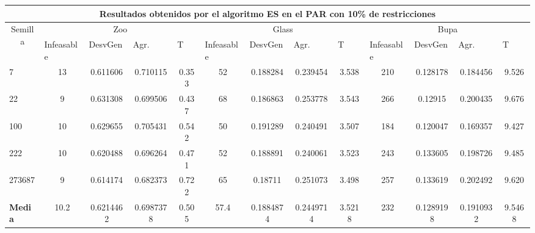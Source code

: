 \begin{table}[H]
	\tiny

	\begin{adjustwidth}{-1cm}{-1cm}%
	
	\begin{tabular}{|l|c|c|c|c|c|c|c|c|c|c|c|c|}
	\hline
	\multicolumn{13}{|c|}{\textbf{Resultados obtenidos por el algoritmo ES en el PAR con 10\% de restricciones}}                                                                                                                                                                                                                                                                                                                                            \\ \hline
	\multicolumn{1}{|c|}{\multirow{2}{*}{Semilla}} & \multicolumn{4}{c|}{Zoo}                                                                                          & \multicolumn{4}{c|}{Glass}                                                                                         & \multicolumn{4}{c|}{Bupa}                                                                                          \\ \cline{2-13} 
	\multicolumn{1}{|c|}{}                                  & \multicolumn{1}{l|}{Infeasable} & \multicolumn{1}{l|}{DesvGen} & \multicolumn{1}{l|}{Agr.} & \multicolumn{1}{l|}{T} & \multicolumn{1}{l|}{Infeasable} & \multicolumn{1}{l|}{DesvGen} & \multicolumn{1}{l|}{Agr.} & \multicolumn{1}{l|}{T} & \multicolumn{1}{l|}{Infeasable} & \multicolumn{1}{l|}{DesvGen} & \multicolumn{1}{l|}{Agr.} & \multicolumn{1}{l|}{T} \\ \hline
	7   	& 13 & 0.611606 & 0.710115 & 0.353 & 			52 & 0.188284 & 0.239454 & 3.538 &			 	210 & 0.128178 & 0.184456 & 9.526 		\\ \hline
	22 		& 9 & 0.631308 & 0.699506 & 0.437 &			68 & 0.186863 & 0.253778 & 3.543 &		 		266 & 0.12915 & 0.200435 & 9.676		\\ \hline
	100 	& 10 & 0.629655 & 0.705431 & 0.542 &			50 & 0.191289 & 0.240491 & 3.507 &			184 & 0.120047 & 0.169357 & 9.427		\\ \hline
	222 	& 10 & 0.620488 & 0.696264 & 0.471 &			52 & 0.188891 & 0.240061 & 3.523 &			243 & 0.133605 & 0.198726 & 9.485		\\ \hline
	273687 	& 9 & 0.614174 & 0.682373 & 0.722 & 			65 & 0.18711 & 0.251073 & 3.498 &			257 & 0.133619 & 0.202492 & 9.620		\\ \hline
	\textbf{Media} & 10.2 & 	0.6214462&	0.6987378	&0.505&	57.4 &	0.1884874 &	0.2449714	& 3.5218 & 	232	& 0.1289198 & 	0.1910932	& 9.5468   \\ \hline
	\end{tabular}
	
	\end{adjustwidth}
	
\end{table}	

